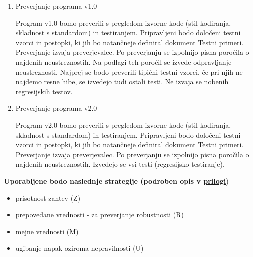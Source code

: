 \documentclass[a4paper,12pt]{article}
\begin{document}
			\begin{enumerate}[label=\alph*)]
				\item Preverjanje programa v1.0

					Program v1.0 bomo preverili s pregledom izvorne kode 
					(stil kodiranja, skladnost s standardom) in testiranjem. 
					Pripravljeni bodo določeni testni vzorci in postopki, 
					ki jih bo natančneje definiral dokument Testni primeri. 
					Preverjanje izvaja preverjevalec. Po preverjanju se izpolnijo 
					pisna poročila o najdenih neustreznostih. Na podlagi teh poročil 
					se izvede odpravljanje neustreznosti. Najprej se bodo preverili 
					tipični testni vzorci, če pri njih ne najdemo resne hibe, se 
					izvedejo tudi ostali testi. Ne izvaja se nobenih regresijskih testov.
				\item Preverjanje programa v2.0

					Program v2.0 bomo preverili s pregledom izvorne kode 
					(stil kodiranja, skladnost s standardom) in testiranjem. Pripravljeni 
					bodo določeni testni vzorci in postopki, ki jih bo natančneje definiral 
					dokument Testni primeri. Preverjanje izvaja preverjevalec. Po preverjanju 
					se izpolnijo pisna poročila o najdenih neustreznostih. Izvedejo se vsi 
					testi (regresijsko testiranje).	
			\end{enumerate}

			\textbf{Uporabljene bodo naslednje strategije (podroben opis v \hyperlink{subsection.1.9}{\ul{prilogi}}})

				\begin{itemize}
					\item prisotnost zahtev (Z)
					\item prepovedane vrednosti - za preverjanje robustnosti (R)
					\item mejne vrednosti (M)
					\item ugibanje napak oziroma nepravilnosti (U)
				\end{itemize}
\newpage
\end{document}
